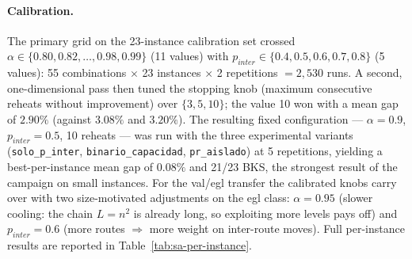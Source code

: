 \paragraph{Calibration.} The primary grid on the 23-instance calibration set
crossed $\alpha \in \{0.80, 0.82, \ldots, 0.98, 0.99\}$ (11 values) with
$p_{inter} \in \{0.4, 0.5, 0.6, 0.7, 0.8\}$ (5 values): 55 combinations
$\times$ 23 instances $\times$ 2 repetitions $= 2{,}530$ runs. A second,
one-dimensional pass then tuned the stopping knob (maximum consecutive
reheats without improvement) over $\{3, 5, 10\}$; the value 10 won with a
mean gap of $2.90\%$ (against $3.08\%$ and $3.20\%$). The resulting fixed
configuration --- $\alpha = 0.9$, $p_{inter} = 0.5$, 10 reheats --- was run
with the three experimental variants (\texttt{solo\_p\_inter},
\texttt{binario\_capacidad}, \texttt{pr\_aislado}) at 5 repetitions,
yielding a best-per-instance mean gap of $0.08\%$ and 21/23 BKS, the
strongest result of the campaign on small instances. For the val/egl
transfer the calibrated knobs carry over with two size-motivated
adjustments on the egl class: $\alpha = 0.95$ (slower cooling: the chain
$L = n^2$ is already long, so exploiting more levels pays off) and
$p_{inter} = 0.6$ (more routes $\Rightarrow$ more weight on inter-route
moves). Full per-instance results are reported in
Table~\ref{tab:sa-per-instance}.
